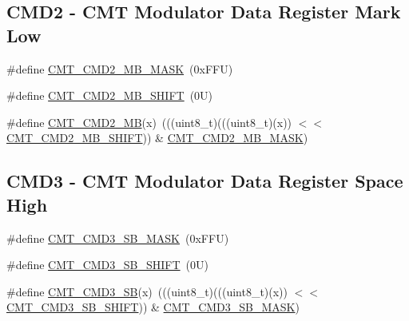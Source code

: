 \subsection*{C\+M\+D2 -\/ C\+MT Modulator Data Register Mark Low}
\begin{DoxyCompactItemize}
\item 
\#define \mbox{\hyperlink{group___c_m_t___register___masks_gac9616164033684cd0d73e63eb6381441}{C\+M\+T\+\_\+\+C\+M\+D2\+\_\+\+M\+B\+\_\+\+M\+A\+SK}}~(0x\+F\+F\+U)
\item 
\#define \mbox{\hyperlink{group___c_m_t___register___masks_gaeff28d00f2825fc455b2f37c218ce24f}{C\+M\+T\+\_\+\+C\+M\+D2\+\_\+\+M\+B\+\_\+\+S\+H\+I\+FT}}~(0\+U)
\item 
\#define \mbox{\hyperlink{group___c_m_t___register___masks_ga87471234abbe07360747af94e8ac2bf0}{C\+M\+T\+\_\+\+C\+M\+D2\+\_\+\+MB}}(x)~(((uint8\+\_\+t)(((uint8\+\_\+t)(x)) $<$$<$ \mbox{\hyperlink{group___c_m_t___register___masks_gaeff28d00f2825fc455b2f37c218ce24f}{C\+M\+T\+\_\+\+C\+M\+D2\+\_\+\+M\+B\+\_\+\+S\+H\+I\+FT}})) \& \mbox{\hyperlink{group___c_m_t___register___masks_gac9616164033684cd0d73e63eb6381441}{C\+M\+T\+\_\+\+C\+M\+D2\+\_\+\+M\+B\+\_\+\+M\+A\+SK}})
\end{DoxyCompactItemize}
\subsection*{C\+M\+D3 -\/ C\+MT Modulator Data Register Space High}
\begin{DoxyCompactItemize}
\item 
\#define \mbox{\hyperlink{group___c_m_t___register___masks_ga0ee814da2957c935fad8b236d52b22f5}{C\+M\+T\+\_\+\+C\+M\+D3\+\_\+\+S\+B\+\_\+\+M\+A\+SK}}~(0x\+F\+F\+U)
\item 
\#define \mbox{\hyperlink{group___c_m_t___register___masks_ga87210814a860e3ea66f06747156fbd9a}{C\+M\+T\+\_\+\+C\+M\+D3\+\_\+\+S\+B\+\_\+\+S\+H\+I\+FT}}~(0\+U)
\item 
\#define \mbox{\hyperlink{group___c_m_t___register___masks_ga431d80d598dabe4e65e1afb9eb9db574}{C\+M\+T\+\_\+\+C\+M\+D3\+\_\+\+SB}}(x)~(((uint8\+\_\+t)(((uint8\+\_\+t)(x)) $<$$<$ \mbox{\hyperlink{group___c_m_t___register___masks_ga87210814a860e3ea66f06747156fbd9a}{C\+M\+T\+\_\+\+C\+M\+D3\+\_\+\+S\+B\+\_\+\+S\+H\+I\+FT}})) \& \mbox{\hyperlink{group___c_m_t___register___masks_ga0ee814da2957c935fad8b236d52b22f5}{C\+M\+T\+\_\+\+C\+M\+D3\+\_\+\+S\+B\+\_\+\+M\+A\+SK}})
\end{DoxyCompactItemize}
